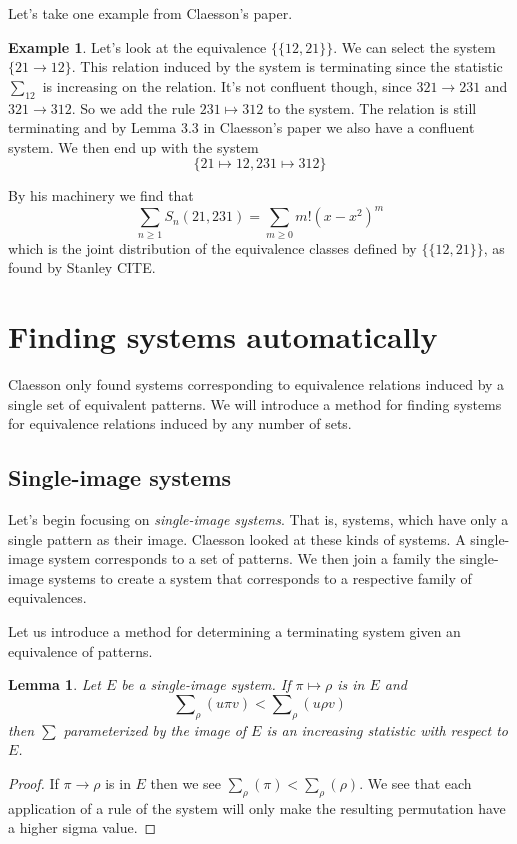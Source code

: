 \documentclass[openany, a4paper, 11pt, english]{article}
\newcommand{\breath}{\vspace{6pt plus 2pt minus 1pt}\noindent}
\newcommand{\patternrule}{ \mapsto \!}
\newtheorem{lemma}[theorem]{Lemma}
\theoremstyle{definition}
\newtheorem{example}[theorem]{Example}
\newcommand{\Sym}{S}
\begin{document}
Let's take one example from Claesson's paper.
\begin{example}
    Let's look at the equivalence $\{ \{ 12, 21 \} \}$. We can select the system $\{
        21 \to 12 \}$. This relation induced by the system is terminating since the statistic
    $\sum_{12}$ is increasing on the relation. It's not
    confluent though, since $321 \to 231$ and $321 \to 312$. So we add the rule
    $231 \patternrule 312$ to the system. The relation is still terminating and by Lemma
    3.3 in Claesson's paper we also have a confluent system. We then end up with
    the system 
    \[
        \{ 21 \patternrule 12, 231 \patternrule 312 \}
    \]

    \breath

    By his machinery we find that 
    \[
        \sum_{n \geq 1} \Sym_n(21, 231) = \sum_{m \geq 0} m!(x-x^2)^m
    \]
    which is the joint distribution of the equivalence classes defined by 
    $\{ \{ 12, 21 \} \}$, as found by Stanley CITE.
\end{example}

\section{Finding systems automatically}
Claesson only found systems corresponding to equivalence relations induced by a
single set of equivalent patterns. We will introduce a method for finding
systems for equivalence relations induced by any number of sets.

\subsection{Single-image systems}

Let's begin focusing on \emph{single-image systems}. That is, systems, which
have only a single pattern as their image. Claesson looked at these kinds
of systems. A single-image system corresponds to a set of patterns.
We then join a family the single-image systems to
create a system that corresponds to a respective family of equivalences.

Let us introduce a method for determining a terminating system given an
equivalence of patterns.

\begin{lemma}
    Let $E$ be a single-image system. If $\pi \patternrule \rho$ is in $E$ and 
    \[
        \sum\nolimits_\rho(u\pi v) < \sum\nolimits_\rho(u \rho v) \tag{$\ast$}
        \label{increasingimage}
    \]
    then $\sum$ parameterized by the image of $E$ is an increasing statistic
    with respect to $E$.
\end{lemma}
\begin{proof}
    If $\pi \to \rho$ is in $E$ then we see $\sum_\rho(\pi) <
    \sum_\rho(\rho)$.  We see that each application of a rule of the system
    will only make the resulting permutation have a higher sigma value.
\end{proof}
\end{document}
